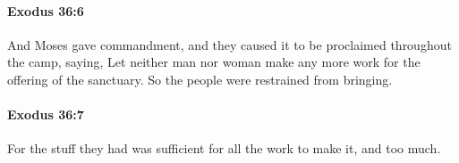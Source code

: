 		\paragraph{Exodus 36:6} %
			\label{EXODUS-36-6}

			And Moses gave commandment, and they caused it to be proclaimed throughout the camp, saying, Let neither man nor woman make any more work for the offering of the sanctuary. So the people were restrained from bringing.


		\paragraph{Exodus 36:7} %
			\label{EXODUS-36-7}

			For the stuff they had was sufficient for all the work to make it, and too much.


